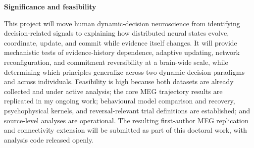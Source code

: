 \documentclass[12pt,letterpaper]{article}
\newcommand{\nsercsection}[1]{\Needspace{2\baselineskip}\vspace{3pt}\noindent\textbf{#1}\par\vspace{0pt}}
\begin{document}
\nsercsection{Significance and feasibility}
This project will move human dynamic-decision neuroscience from identifying decision-related signals to explaining how distributed neural states evolve, coordinate, update, and commit while evidence itself changes. It will provide mechanistic tests of evidence-history dependence, adaptive updating, network reconfiguration, and commitment reversibility at a brain-wide scale, while determining which principles generalize across two dynamic-decision paradigms and across individuals. Feasibility is high because both datasets are already collected and under active analysis; the core MEG trajectory results are replicated in my ongoing work; behavioural model comparison and recovery, psychophysical kernels, and reversal-relevant trial definitions are established; and source-level analyses are operational. The resulting first-author MEG replication and connectivity extension will be submitted as part of this doctoral work, with analysis code released openly.
\end{document}
